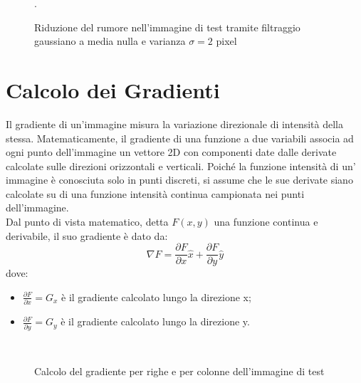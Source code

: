 \begin{figure}[!ht]
\centering
{}
\hspace{3mm}
\caption{Riduzione del rumore nell'immagine di test tramite filtraggio gaussiano a media nulla e varianza $\sigma = 2$ pixel}.
\label{fig:immagine_rumore}
\end{figure}


\section{Calcolo dei Gradienti}
Il gradiente di un'immagine misura la variazione direzionale di intensità della stessa.
Matematicamente, il gradiente di una funzione a due variabili  associa ad ogni punto dell'immagine un vettore 2D con componenti date dalle derivate calcolate sulle direzioni orizzontali e verticali. 
Poiché la funzione intensità di un' immagine è conosciuta solo in punti discreti, si assume che le sue derivate siano calcolate su di una funzione intensità continua campionata nei punti dell'immagine.
\\

Dal punto di vista matematico, detta $F(x,y)$ una funzione continua e derivabile, il suo gradiente è dato da:
\begin{equation}
\label{eq:gradiente}
\nabla F=\frac{\partial F}{\partial x}\hat x + \frac{\partial F}{\partial y}\hat y
\end{equation}
dove:
\begin{itemize}
\item $\frac{\partial F}{\partial x}=G_{x}$ è il gradiente calcolato lungo la direzione x;
\item $\frac{\partial F}{\partial y}=G_{y}$ è il gradiente calcolato lungo la direzione y.
\end{itemize}

\begin{figure}[!ht,scale=0.8]
\centering
{}
\\
\hspace{3mm}
\caption{Calcolo del gradiente per righe e per colonne dell'immagine di test}
\label{fig:immagine_gradienti}
\end{figure}

